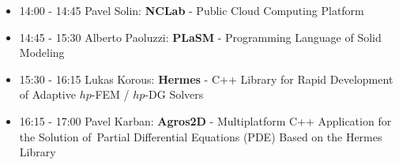 \documentclass[10pt, A4]{article}%
\begin{document}
\begin{itemize}
  \begin{itemize}
    \item 14:00 - 14:45 Pavel Solin: {\bf NCLab} - Public Cloud Computing Platform
    \item 14:45 - 15:30 Alberto Paoluzzi: {\bf PLaSM} - Programming Language of Solid Modeling
    \item 15:30 - 16:15 Lukas Korous: {\bf Hermes} - C++ Library for Rapid Development of Adaptive $hp$-FEM / $hp$-DG Solvers
    \item 16:15 - 17:00 Pavel Karban: {\bf Agros2D} - Multiplatform C++ Application for the Solution of~Partial Differential Equations (PDE) Based on the Hermes Library  
  \end{itemize}
\end{itemize}
\end{document}
